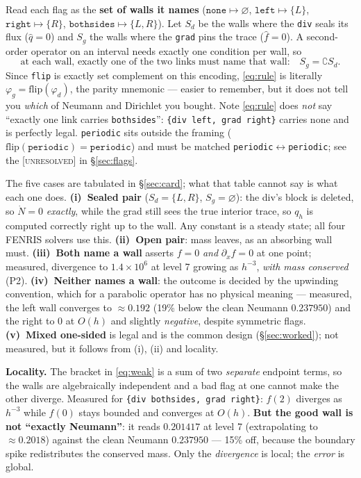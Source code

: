 \documentclass[10pt]{article}
\newcommand{\code}[1]{\texttt{#1}}
\newcommand{\hq}{\widehat{q}}
\newcommand{\hf}{\widehat{f}}
\newcommand{\UNR}{\textcolor{red!60!black}{\textsc{[unresolved]}}}
\begin{document}
Read each flag as the \textbf{set of walls it names}
($\code{none}\mapsto\varnothing$, $\code{left}\mapsto\{L\}$,
$\code{right}\mapsto\{R\}$, $\code{bothsides}\mapsto\{L,R\}$). Let $S_d$ be the
walls where the \code{div} seals its flux ($\hq=0$) and $S_g$ the walls where the
\code{grad} pins the trace ($\hf=0$). A second-order operator on an interval
needs exactly one condition per wall, so
\begin{equation}
\boxed{\;\text{at each wall, exactly one of the two links must name that wall:}
\quad S_g = \complement S_d .\;}
\label{eq:rule}
\end{equation}
Since \code{flip} is exactly set complement on this encoding, \eqref{eq:rule} is
literally $\varphi_g=\mathrm{flip}(\varphi_d)$, the parity mnemonic --- easier to
remember, but it does not tell you \emph{which} of Neumann and Dirichlet you
bought. Note \eqref{eq:rule} does \emph{not} say ``exactly one link carries
\code{bothsides}'': \code{\{div left, grad right\}} carries none and is perfectly
legal. \code{periodic} sits outside the framing
($\mathrm{flip}(\code{periodic})=\code{periodic}$) and must be matched
\code{periodic}$\leftrightarrow$\code{periodic}; see the \UNR{} in
\S\ref{sec:flags}.

The five cases are tabulated in \S\ref{sec:card}; what that table cannot say is
what each one does. \textbf{(i)~Sealed pair} ($S_d=\{L,R\}$, $S_g=\varnothing$):
the div's block is deleted, so $\dot N=0$ \emph{exactly}, while the grad still
sees the true interior trace, so $q_h$ is computed correctly right up to the
wall. Any constant is a steady state; all four FENRIS solvers use this.
\textbf{(ii)~Open pair}: mass leaves, as an absorbing wall must.
\textbf{(iii)~Both name a wall} asserts $f=0$ \emph{and} $\partial_xf=0$ at one
point; measured, divergence to $1.4\times10^6$ at level 7 growing as $h^{-3}$,
\emph{with mass conserved} (P2). \textbf{(iv)~Neither names a wall}: the outcome
is decided by the upwinding convention, which for a parabolic operator has no
physical meaning --- measured, the left wall converges to $\approx0.192$ (19\%
below the clean Neumann $0.237950$) and the right to $0$ at $O(h)$ and slightly
\emph{negative}, despite symmetric flags. \textbf{(v)~Mixed one-sided} is legal
and is the common design (\S\ref{sec:worked}); not measured, but it follows from
(i), (ii) and locality.

\textbf{Locality.} The bracket in \eqref{eq:weak} is a sum of two \emph{separate}
endpoint terms, so the walls are algebraically independent and a bad flag at one
cannot make the other diverge. Measured for \code{\{div bothsides, grad right\}}:
$f(2)$ diverges as $h^{-3}$ while $f(0)$ stays bounded and converges at $O(h)$.
\textbf{But the good wall is not ``exactly Neumann''}: it reads $0.201417$ at
level 7 (extrapolating to $\approx0.2018$) against the clean Neumann
$0.237950$ --- 15\% off, because the boundary spike redistributes the conserved
mass. Only the \emph{divergence} is local; the \emph{error} is global.
\end{document}
